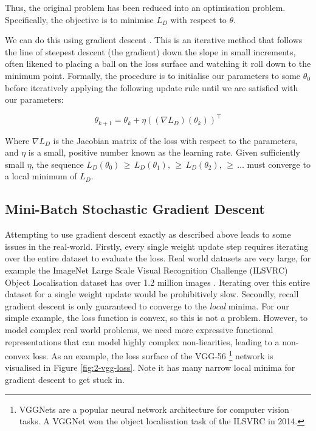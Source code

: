 Thus, the original problem has been reduced into an optimisation problem. Specifically, the objective is to minimise \(L_D\) with respect to \(\theta\).

We can do this using gradient descent \cite{Cauchy1847}. This is an iterative method that follows the line of steepest descent (the gradient) down the slope in small increments, often likened to placing a ball on the loss surface and watching it roll down to the minimum point. Formally, the procedure is to initialise our parameters to some \(\theta_0\) before iteratively applying the following update rule until we are satisfied with our parameters:

\begin{equation*}
    \theta_{k+1} = \theta_k + \eta((\nabla L_D)(\theta_k))^\top
\end{equation*}

Where \(\nabla L_D\) is the Jacobian matrix of the loss with respect to the parameters, and \(\eta\) is a small, positive number known as the learning rate. Given sufficiently small \(\eta\), the sequence \(L_D(\theta_0) \,\geq\, L_D(\theta_1), \,\geq\, L_D(\theta_2), \,\geq\, \ldots\) must converge to a local minimum of \(L_D\). 

\subsection{Mini-Batch Stochastic Gradient Descent}
Attempting to use gradient descent exactly as described above leads to some issues in the real-world. Firstly, every single weight update step requires iterating over the entire dataset to evaluate the loss. Real world datasets are very large, for example the ImageNet Large Scale Visual Recognition Challenge (ILSVRC) Object Localisation dataset has over 1.2 million images \cite{ILSVRC15}. Iterating over this entire dataset for a single weight update would be prohibitively slow. Secondly, recall gradient descent is only guaranteed to converge to the \textit{local} minima. For our simple example, the loss function is convex, so this is not a problem. However, to model complex real world problems, we need more expressive functional representations that can model highly complex non-liearities, leading to a non-convex loss. As an example, the loss surface of the VGG-56 \footnote{VGGNets are a popular neural network architecture for computer vision tasks. A VGGNet won the object localisation task of the ILSVRC in 2014.} network \cite{Simonyan2014} is visualised in Figure \ref{fig:2-vgg-loss}. Note it has many narrow local minima for gradient descent to get stuck in.

